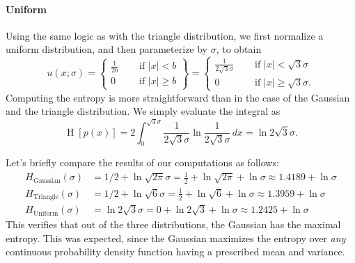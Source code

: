 \documentclass[12pt, a4paper]{article}
\newcommand{\abs}[1]{\left\lvert#1\right\rvert}
\renewcommand{\H}{\operatorname{H}}
\begin{document}
\paragraph{Uniform}
Using the same logic as with the triangle distribution, we first normalize a uniform distribution, and then parameterize by $\sigma$, to obtain
\begin{equation*}
u(x; \sigma) =
\left\{\!\begin{aligned}
\frac{1}{2b} &\quad \text{ if } \abs{x} < b \\
0 &\quad \text{ if } \abs{x} \geq b 
\end{aligned}\right\}
= 
\left\{\!\begin{aligned}
\frac{1}{2\sqrt{3}\sigma} &\quad \text{ if } \abs{x} <\sqrt{3}\sigma \\
0 &\quad \text{ if } \abs{x} \geq \sqrt{3}\sigma.
\end{aligned}\right.
\end{equation*}
Computing the entropy is more straightforward than in the case of the Gaussian and the triangle distribution.
We simply evaluate the integral as
\begin{equation*}
\H\left[p(x)\right] =2  \int_0^{\sqrt{3} \sigma} \frac{1}{2\sqrt{3}\sigma} \ln \frac{1}{2\sqrt{3}\sigma}  \, dx = \ln 2 \sqrt{3} \sigma.
\end{equation*}

Let's briefly compare the results of our computations as follows:
\begin{align*}
	H_\text{Gaussian}(\sigma) &= 1/2 + \ln \sqrt{2 \pi } \sigma = \frac{1}{2} + \ln \sqrt{2\pi}  + \ln \sigma \approx 1.4189 + \ln \sigma \\
	H_\text{Triangle}(\sigma) &= 1/2 + \ln \sqrt{6} \sigma = \frac{1}{2} + \ln \sqrt{6} + \ln \sigma \approx 1.3959 + \ln \sigma \\
	H_\text{Uniform}(\sigma) &= \ln 2 \sqrt{3} \sigma = 0 + \ln 2 \sqrt{3} + \ln \sigma \approx 1.2425 + \ln \sigma
\end{align*}
This verifies that out of the three distributions, the Gaussian has the maximal entropy.
This was expected, since the Gaussian maximizes the entropy over \emph{any} continuous probability density function having a prescribed mean and variance.
\end{document}
